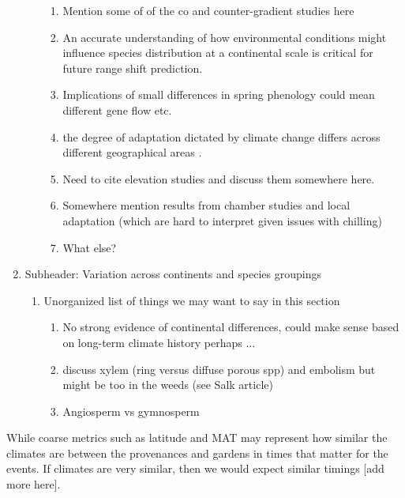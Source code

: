 \documentclass{article}
\begin{document}
\begin{enumerate}
\begin{enumerate}
\begin{enumerate}
 \item Mention some of of the co and counter-gradient studies here
  \item  An accurate understanding of how environmental conditions might influence species distribution at a continental scale is critical for future range shift prediction.
 \item Implications of small differences in spring phenology could mean different gene flow etc. 
  \item the degree of adaptation dictated by climate change differs across different geographical areas \citep{Loarie09}. 
  \item Need to cite elevation studies and discuss them somewhere here.
  \item Somewhere mention results from chamber studies and local adaptation (which are hard to interpret given issues with chilling) 
 \item What else?
 \end{enumerate}
  \end{enumerate}
 \item Subheader: Variation across continents and species groupings
 \begin{enumerate}
 \item  Unorganized list of things we may want to say in this section
 \begin{enumerate}
 \item No strong evidence of continental differences, could make sense based on long-term climate history perhaps ... 
\item discuss xylem (ring versus diffuse porous spp) and embolism but might be too in the weeds (see Salk article)
\item Angiosperm vs gymnosperm
 \end{enumerate}
 \end{enumerate}
\end{enumerate}


While coarse metrics such as latitude and MAT may represent how similar the climates are between the provenances and gardens in times that matter for the events. If climates are very similar, then we would expect similar timings [add more here].
\end{document}
